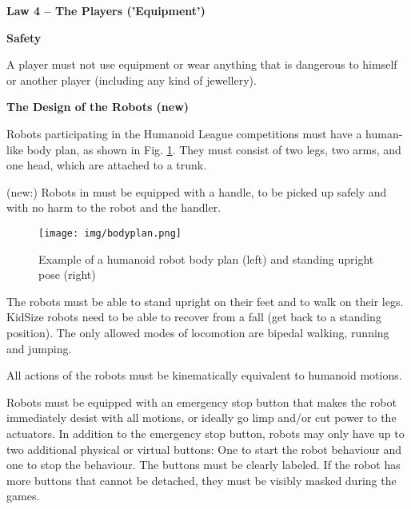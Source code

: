 \clearpage
\sffamily
{\bfseries\color[rgb]{0.4,0.4,0.4}
Law 4 -- The Players ('Equipment')}
{}

\bigskip

{\bfseries Safety }

\headlinebox

A player must not use equipment or wear anything that is dangerous to himself or another player (including any kind of jewellery).

\bigskip

{\bfseries The Design of the Robots (new)}

\headlinebox

Robots participating in the Humanoid League competitions must have a human-like body plan, as shown in Fig. \ref{fig:bodyplan}. They must consist of two legs, two arms, and one head, which are attached to a trunk.

\bigskip

(new:) Robots in   must be
equipped with a handle, to be picked up safely and with no harm to the robot and
the handler.


\begin{figure}[h]
\begin{center}
\texttt{[image: img/bodyplan.png]}
\caption{Example of a humanoid robot body plan (left) and standing upright pose (right)}
\label{fig:bodyplan}
\vspace{-3ex}
\end{center}
\end{figure}


The robots must be able to stand upright on their feet and to walk on their legs.
KidSize  robots need to be able to recover from a fall
(get back to a standing position).
The only allowed modes of locomotion are bipedal walking, running and jumping.

\bigskip

All actions of the robots must be kinematically equivalent to humanoid motions.

\bigskip

Robots must be equipped with an emergency stop button that makes the robot immediately desist with all motions, or ideally go limp and/or cut power to the actuators. In addition to the emergency stop button, robots may only have up to two additional physical or virtual buttons: One to start the robot behaviour and one to stop the behaviour. The buttons must be clearly labeled. If the robot has more buttons that cannot be detached, they must be visibly masked during the games.


